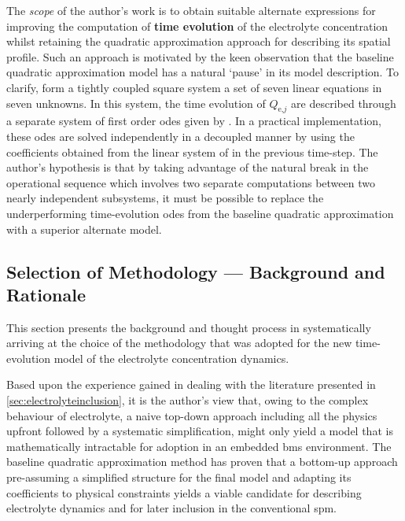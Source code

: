 The  \emph{scope}  of  the  author's   work  is  to  obtain  suitable  alternate
expressions  for  improving  the   computation  of  \textbf{time  evolution}  of
the  electrolyte  concentration  whilst retaining  the  quadratic  approximation
approach   for   describing  its   spatial   profile.   Such  an   approach   is
motivated   by    the   keen    observation   that   the    baseline   quadratic
approximation  model  has  a  natural  `pause'  in  its  model  description.  To
clarify,   form a  tightly
coupled  square  system  \ie{}  a  set   of  seven  linear  equations  in  seven
unknowns.   In   this   system,   the   time   evolution   of   $Q_{\text{e,}j}$
are   described  through   a  separate   system  of   first  order   \glspl{ode}
given by .  In a
practical  implementation,  these  \glspl{ode}  are solved  independently  in  a
decoupled  manner \ie{}  by  using  the coefficients  obtained  from the  linear
system of  in the previous
time-step. The  author's hypothesis is that  by taking advantage of  the natural
break  in the  operational  sequence which  involves  two separate  computations
between  two nearly  independent  subsystems,  it must  be  possible to  replace
the  underperforming  time-evolution  \glspl{ode} from  the  baseline  quadratic
approximation with a superior alternate model.

\subsection{Selection of Methodology --- Background and Rationale}\label{subsec:sysidbackground}


This  section presents  the  background and  thought  process in  systematically
arriving  at  the  choice of  the  methodology  that  was  adopted for  the  new
time-evolution model of the electrolyte concentration dynamics.

Based  upon the  experience  gained  in dealing  with  the literature  presented
in \cref{sec:electrolyteinclusion}, it is  the author's view that,  owing to the
complex behaviour of electrolyte, a  naive top-down approach \ie{} including all
the physics upfront followed by a  systematic simplification, might only yield a
model that is  mathematically intractable for adoption in  an embedded \gls{bms}
environment.  The baseline  quadratic  approximation method  has  proven that  a
bottom-up approach \ie{} pre-assuming a simplified structure for the final model
and adapting its coefficients to  physical constraints yields a viable candidate
for describing electrolyte dynamics and  for later inclusion in the conventional
\gls{spm}.

